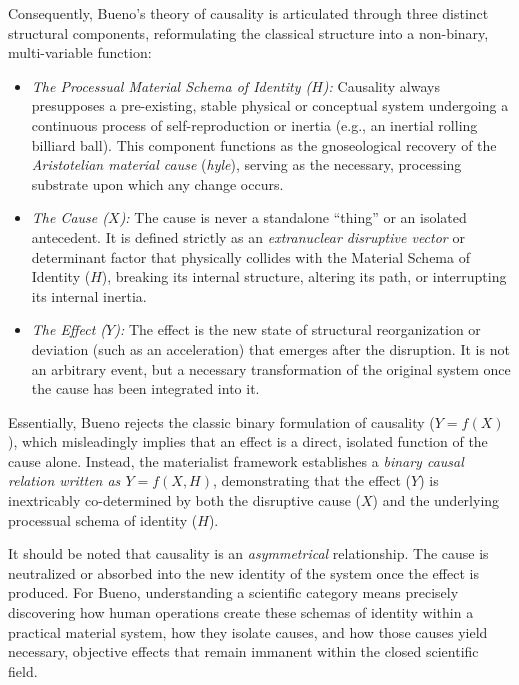 \documentclass[11pt, a4paper]{article}
\begin{document}
Consequently, Bueno's theory of causality is articulated through three distinct structural components, reformulating the classical structure into a non-binary, multi-variable function:
\begin{itemize}
    \item \emph{The Processual Material Schema of Identity ($H$):}  Causality always presupposes a pre-existing, stable physical or conceptual system undergoing a continuous process of self-reproduction or inertia (e.g., an inertial rolling billiard ball). This component functions as the gnoseological recovery of the \emph{Aristotelian material cause} (\emph{hyle}), serving as the necessary, processing substrate upon which any change occurs.

    \item \emph{The Cause ($X$):} The cause is never a standalone ``thing'' or an isolated antecedent. It is defined strictly as an \emph{extranuclear disruptive vector} or determinant factor that physically collides with the Material Schema of Identity ($H$), breaking its internal structure, altering its path, or interrupting its internal inertia.

    \item \emph{The Effect ($Y$):} The effect is the new state of structural reorganization or deviation (such as an acceleration) that emerges after the disruption. It is not an arbitrary event, but a necessary transformation of the original system once the cause has been integrated into it.
\end{itemize}

Essentially, Bueno rejects the classic binary formulation of causality ($Y = f(X)$), which misleadingly implies that an effect is a direct, isolated function of the cause alone. Instead, the materialist framework establishes a \emph{binary causal relation written as $Y = f(X, H)$}, demonstrating that the effect ($Y$) is inextricably co-determined by both the disruptive cause ($X$) and the underlying processual schema of identity ($H$).

It should be noted that causality is an \emph{asymmetrical} relationship. The cause is neutralized or absorbed into the new identity of the system once the effect is produced. For Bueno, understanding a scientific category means precisely discovering how human operations create these schemas of identity within a practical material system, how they isolate causes, and how those causes yield necessary, objective effects that remain immanent within the closed scientific field.
\end{document}
